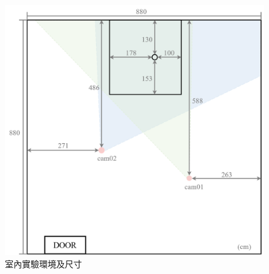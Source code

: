 \begin{figure}[!ht]
   \centering
   \includegraphics[width=\linewidth]{figure/ch3_fig_indoor_scale.png}
    \caption[室內實驗環境及尺寸]{室內實驗環境及尺寸}
    \label{ch3_fig_indoor_scale}
\end{figure}

